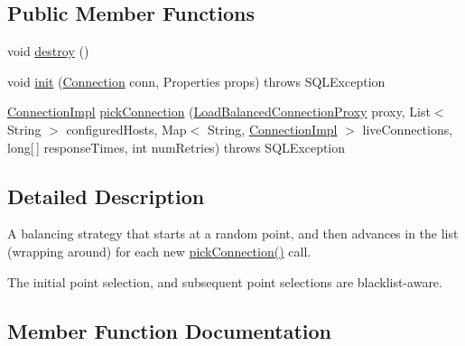 \subsection*{Public Member Functions}
\begin{DoxyCompactItemize}
\item 
void \mbox{\hyperlink{classcom_1_1mysql_1_1jdbc_1_1_sequential_balance_strategy_abccd73f5079046d6f7a183576b49fc2a}{destroy}} ()
\item 
void \mbox{\hyperlink{classcom_1_1mysql_1_1jdbc_1_1_sequential_balance_strategy_af65fb561c63eee645ba22169ed2eaabb}{init}} (\mbox{\hyperlink{interfacecom_1_1mysql_1_1jdbc_1_1_connection}{Connection}} conn, Properties props)  throws S\+Q\+L\+Exception 
\item 
\mbox{\hyperlink{classcom_1_1mysql_1_1jdbc_1_1_connection_impl}{Connection\+Impl}} \mbox{\hyperlink{classcom_1_1mysql_1_1jdbc_1_1_sequential_balance_strategy_a382180c797efcc912292dc511beafa4d}{pick\+Connection}} (\mbox{\hyperlink{classcom_1_1mysql_1_1jdbc_1_1_load_balanced_connection_proxy}{Load\+Balanced\+Connection\+Proxy}} proxy, List$<$ String $>$ configured\+Hosts, Map$<$ String, \mbox{\hyperlink{classcom_1_1mysql_1_1jdbc_1_1_connection_impl}{Connection\+Impl}} $>$ live\+Connections, long\mbox{[}$\,$\mbox{]} response\+Times, int num\+Retries)  throws S\+Q\+L\+Exception 
\end{DoxyCompactItemize}


\subsection{Detailed Description}
A balancing strategy that starts at a random point, and then advances in the list (wrapping around) for each new \mbox{\hyperlink{classcom_1_1mysql_1_1jdbc_1_1_sequential_balance_strategy_a382180c797efcc912292dc511beafa4d}{pick\+Connection()}} call.

The initial point selection, and subsequent point selections are blacklist-\/aware. 

\subsection{Member Function Documentation}
\mbox{\label{classcom_1_1mysql_1_1jdbc_1_1_sequential_balance_strategy_abccd73f5079046d6f7a183576b49fc2a}} 
